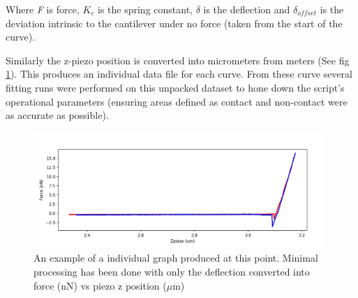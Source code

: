 Where \textit{F} is force, $K_c$ is the spring constant, $\delta$ is the deflection and $\delta _{offset}$ is the deviation intrinsic to the cantilever under no force (taken from the start of the curve). %

Similarly the z-piezo position is converted into micrometers from meters (See fig \ref{fig:EgRawGraph}). This produces an individual data file for each curve. From these curve several fitting runs were performed on this unpacked dataset to hone down the script's operational parameters (ensuring areas defined as contact and non-contact were as accurate as possible).

\begin{figure}[h!]     %
        \begin{center}
          \includegraphics[width=110mm]{chapter4/EgRawGraph.jpg}
\end{center}
\caption{An example of a individual graph produced at this point. Minimal processing has been done with only the deflection converted into force (nN) vs piezo z position ($\mu$m)}
\label{fig:EgRawGraph}                 %
\end{figure}



